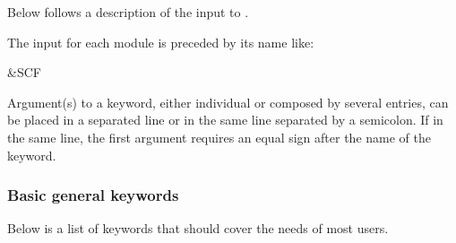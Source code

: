 Below follows a description of the input to .

The input for each module is preceded by its name like:
\begin{inputlisting}
 &SCF
\end{inputlisting}

Argument(s) to a keyword, either individual or composed by several entries,
can be placed in a separated line or in the same line separated by a semicolon.
If in the same line, the first argument requires an equal sign after the
name of the keyword.

\subsubsection{Basic general keywords}
Below is a list of keywords that should cover the needs of most users.
